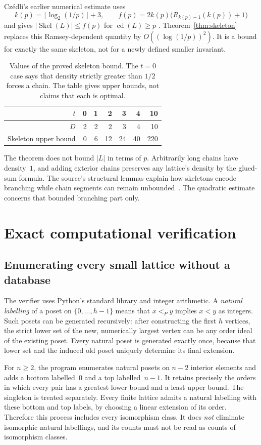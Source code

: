 \documentclass[11pt,a4paper]{article}
\numberwithin{equation}{section}
\theoremstyle{definition}
\theoremstyle{remark}
\DeclareMathOperator{\Skel}{Skel}
\DeclareMathOperator{\cdens}{cd}
\newcommand{\card}[1]{\lvert #1\rvert}
\begin{document}
Cz\'edli's earlier numerical estimate uses
\[
 k(p)=\lfloor\log_2(1/p)\rfloor+3,
 \qquad
 f(p)=2k(p)\bigl(R_{k(p)-1}(k(p))+1\bigr)
\]
and gives $\card{\Skel(L)}\le f(p)$ for $\cdens(L)\ge p$
\cite[Lemma~5.5]{czedli}.
Theorem~\ref{thm:skeleton} replaces this Ramsey-dependent quantity by
$O((\log(1/p))^2)$. It is a bound for exactly the same skeleton, not for a
newly defined smaller invariant.

\begin{table}[htbp]
\centering
\begin{tabular}{@{}rrrrrrr@{}}
\toprule
$t$ &0&1&2&3&4&10\\
\midrule
$D$ &2&2&2&3&4&10\\
Skeleton upper bound &0&6&12&24&40&220\\
\bottomrule
\end{tabular}
\caption{Values of the proved skeleton bound. The $t=0$ case says that density
strictly greater than $1/2$ forces a chain. The table gives upper bounds, not
claims that each is optimal.}
\end{table}

The theorem does not bound $\card L$ in terms of $p$.
Arbitrarily long chains have density~$1$, and adding exterior chains preserves
any lattice's density by the glued-sum formula.
The source's structural lemmas explain how skeletons encode branching while
chain segments can remain unbounded~\cite[Lemmas~5.2--5.4]{czedli}.
The quadratic estimate concerns that bounded branching part only.

\section{Exact computational verification}\label{sec:verification}
\subsection{Enumerating every small lattice without a database}
The verifier uses Python's standard library and integer arithmetic.
A \emph{natural labelling} of a poset on $\{0,\ldots,h-1\}$ means that
$x<_{P}y$ implies $x<y$ as integers. Such posets can be generated recursively:
after constructing the first $h$ vertices, the strict lower set of the new,
numerically largest vertex can be any order ideal of the existing poset.
Every natural poset is generated exactly once, because that lower set and the
induced old poset uniquely determine its final extension.

For $n\ge2$, the program enumerates natural posets on $n-2$ interior elements
and adds a bottom labelled~$0$ and a top labelled~$n-1$.
It retains precisely the orders in which every pair has a greatest lower bound
and a least upper bound. The singleton is treated separately.
Every finite lattice admits a natural labelling with these bottom and top
labels, by choosing a linear extension of its order. Therefore this process
includes every isomorphism class. It does \emph{not} eliminate isomorphic
natural labellings, and its counts must not be read as counts of isomorphism
classes.
\end{document}
